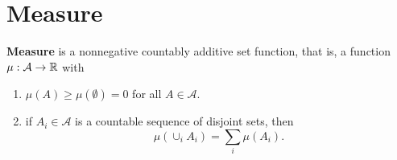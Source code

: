 \section{Measure}

\begin{definition}[Measure]
	\textbf{Measure} is a nonnegative countably additive set function, that is, a function $\mu:\mathcal{A}\rightarrow{\mathbb R}$ with
	\begin{enumerate}
		\item $\mu(A)\geq\mu(\emptyset)=0$ for all $A\in\mathcal{A}$.
		\item if $A_i\in\mathcal{A}$ is a countable sequence of disjoint sets, then $$\mu(\cup_iA_i)=\sum_i\mu(A_i).$$
	\end{enumerate}
\end{definition}





